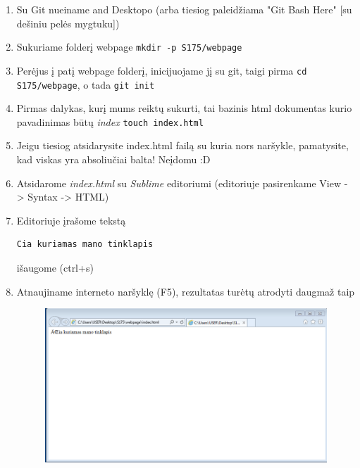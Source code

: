 \documentclass[11pt,a4paper]{article}
\begin{document}
\begin{enumerate}

\item Su Git nueiname and Desktopo (arba tiesiog paleidžiama "Git Bash Here" [su dešiniu pelės mygtuku])

\item Sukuriame folderį webpage \colorbox{listinggray}{\lstinline|mkdir -p S175/webpage|}

\item Perėjus į patį webpage folderį, inicijuojame jį su git, taigi pirma \colorbox{listinggray}{\lstinline|cd S175/webpage|}, o tada \colorbox{listinggray}{\lstinline|git init|}

\item Pirmas dalykas, kurį mums reiktų sukurti, tai bazinis html dokumentas kurio pavadinimas būtų \textit{index} \colorbox{listinggray}{\lstinline|touch index.html|}

\item Jeigu tiesiog atsidarysite index.html failą su kuria nors naršykle, pamatysite, kad viskas yra absoliučiai balta! Neįdomu :D

\item Atsidarome \textit{index.html} su \textit{Sublime} editoriumi (editoriuje pasirenkame View -> Syntax -> HTML)


\item Editoriuje įrašome tekstą
\begin{lstlisting}
Cia kuriamas mano tinklapis
\end{lstlisting}
išaugome (ctrl+s)


\item Atnaujiname interneto naršyklę (F5), rezultatas turėtų atrodyti daugmaž taip

\begin{figure}[ht]
\center
\includegraphics[scale=0.3]{webpage_1.png}
\end{figure}


\end{enumerate}
\end{document}

